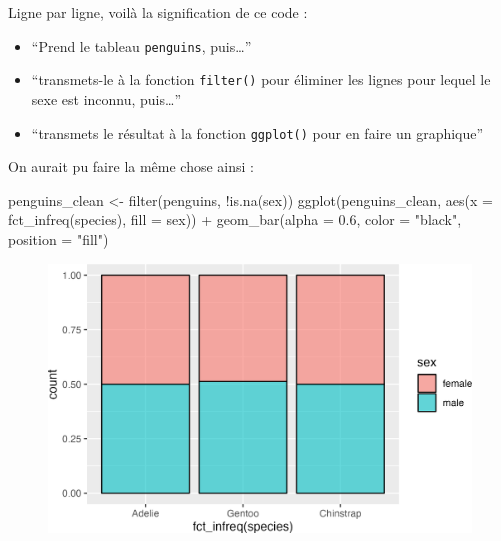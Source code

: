\documentclass[
  letterpaper,
  DIV=11,
  numbers=noendperiod]{scrreprt}
\newenvironment{Shaded}{\begin{snugshade}}{\end{snugshade}}
\newcommand{\AttributeTok}[1]{\textcolor[rgb]{0.40,0.45,0.13}{#1}}
\newcommand{\FloatTok}[1]{\textcolor[rgb]{0.68,0.00,0.00}{#1}}
\newcommand{\FunctionTok}[1]{\textcolor[rgb]{0.28,0.35,0.67}{#1}}
\newcommand{\NormalTok}[1]{\textcolor[rgb]{0.00,0.23,0.31}{#1}}
\newcommand{\OtherTok}[1]{\textcolor[rgb]{0.00,0.23,0.31}{#1}}
\newcommand{\SpecialCharTok}[1]{\textcolor[rgb]{0.37,0.37,0.37}{#1}}
\newcommand{\StringTok}[1]{\textcolor[rgb]{0.13,0.47,0.30}{#1}}
\providecommand{\tightlist}{%
  \setlength{\itemsep}{0pt}\setlength{\parskip}{0pt}}\usepackage{longtable,booktabs,array}
\begin{document}
Ligne par ligne, voilà la signification de ce code :

\begin{itemize}
\tightlist
\item
  ``Prend le tableau \texttt{penguins}, puis\ldots{}''
\item
  ``transmets-le à la fonction \texttt{filter()} pour éliminer les
  lignes pour lequel le sexe est inconnu, puis\ldots{}''
\item
  ``transmets le résultat à la fonction \texttt{ggplot()} pour en faire
  un graphique''
\end{itemize}

On aurait pu faire la même chose ainsi :

\begin{Shaded}
\begin{Highlighting}[]
\NormalTok{penguins\_clean }\OtherTok{\textless{}{-}} \FunctionTok{filter}\NormalTok{(penguins, }\SpecialCharTok{!}\FunctionTok{is.na}\NormalTok{(sex))}
\FunctionTok{ggplot}\NormalTok{(penguins\_clean, }\FunctionTok{aes}\NormalTok{(}\AttributeTok{x =} \FunctionTok{fct\_infreq}\NormalTok{(species), }\AttributeTok{fill =}\NormalTok{ sex)) }\SpecialCharTok{+}
    \FunctionTok{geom\_bar}\NormalTok{(}\AttributeTok{alpha =} \FloatTok{0.6}\NormalTok{, }\AttributeTok{color =} \StringTok{"black"}\NormalTok{, }\AttributeTok{position =} \StringTok{"fill"}\NormalTok{)}
\end{Highlighting}
\end{Shaded}

\begin{figure}[H]

{\centering \includegraphics{./04-DataWrangling_files/figure-pdf/unnamed-chunk-13-1.png}

}

\end{figure}
\end{document}
